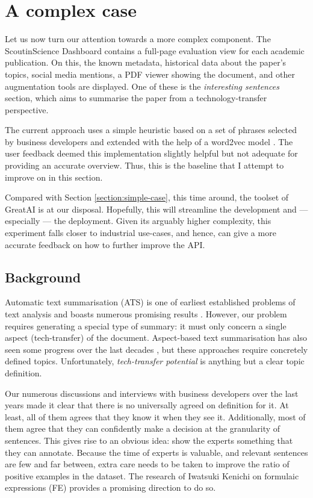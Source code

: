 \section{A complex case}

Let us now turn our attention towards a more complex component. The ScoutinScience Dashboard contains a full-page evaluation view for each academic publication. On this, the known metadata, historical data about the paper's topics, social media mentions, a PDF viewer showing the document, and other augmentation tools are displayed. One of these is the \textit{interesting sentences} section, which aims to summarise the paper from a technology-transfer perspective.

The current approach uses a simple heuristic based on a set of phrases selected by business developers and extended with the help of a word2vec model \cite{mikolov2013efficient}. The user feedback deemed this implementation slightly helpful but not adequate for providing an accurate overview. Thus, this is the baseline that I attempt to improve on in this section.

\begin{displayquote}
Compared with Section \ref{section:simple-case}, this time around, the toolset of GreatAI is at our disposal. Hopefully, this will streamline the development and --- especially --- the deployment. Given its arguably higher complexity, this experiment falls closer to industrial use-cases, and hence, can give a more accurate feedback on how to further improve the API.
\end{displayquote}

\subsection{Background}

Automatic text summarisation (ATS) is one of earliest established problems of text analysis and boasts numerous promising results \cite{el2021automatic}. However, our problem requires generating a special type of summary: it must only concern a single aspect (tech-transfer) of the document. Aspect-based text summarisation has also seen some progress over the last decades \cite{berkovsky2008aspect,hayashi2021wikiasp}, but these approaches require concretely defined topics. Unfortunately, \textit{tech-transfer potential} is anything but a clear topic definition.

Our numerous discussions and interviews with business developers over the last years made it clear that there is no universally agreed on definition for it. At least, all of them agrees that they know it when they see it. Additionally, most of them agree that they can confidently make a decision at the granularity of sentences. This gives rise to an obvious idea: show the experts something that they can annotate. Because the time of experts is valuable, and relevant sentences are few and far between, extra care needs to be taken to improve the ratio of positive examples in the dataset. The research of Iwatsuki Kenichi on formulaic expressions (FE) \cite{iwatsuki2020evaluation,iwatsuki2021extraction,iwatsuki2021communicative,iwatsuki2022extraction} provides a promising direction to do so. 

